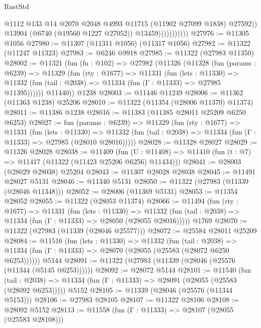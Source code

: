 \begin{lexlean}{RustStd}
\begin{coremodule}
                              @1112
                              @133
                              @14
                              @2070
                              @2048
                              @4993
                              @11715
                              (@11902 @27099 @1838)
                              @27592))
                          @13904
                          (@6740 (@19560 @1227 @27052))
                          @13459)))))))))))
@27976 := @11305 @1056
@27980 := @11307 (@11311 @1056) (@11317 @1056)
@27982 := @11322 (@11247 @11323)
@27983 := @6246 @9918
@27985 := @11322 (@27983 @11350)
@28002 := @11321
    (fun (fn : @102) =>
    @27982
      (@11326
        (@11328
          (fun (params : @6239) =>
          @11329
            (fun (rty : @1677) =>
            @11331
              (fun (lets : @11330) =>
              @11332 (fun (tail : @2038) => @11334 (fun (Γ : @11333) => @27985 @11395))))))
        @11440))
    @1238
@28003 := @11446 @11249
@28006 := @11362 (@11363 @1238) @25206
@28010 := @11322 (@11354 (@28006 @11370) @11374)
@28011 := @11386 @1238
@28016 := @11383 (@11385 @28011 @25209 @6250 @6253)
@28027 := fun (params : @6239) =>
  @11329
    (fun (rty : @1677) =>
    @11331
      (fun (lets : @11330) =>
      @11332 (fun (tail : @2038) => @11334 (fun (Γ : @11333) => @27985 (@28010 @28016)))))
@28028 := @11328 @28027
@28029 := @11326 @28028
@28038 := @11409
    (fun (U : @11408) => @11410 (fun (t : @7) => @11417 (@11322 (@11423 @25206 @6256) @11434)))
@28041 := @28003 (@28029 @28038) @25204
@28043 := @11307 @28028 @28038
@28045 := @11491 @28027 @5131
@28046 := @11340 @5131
@28050 := @11322 (@27983 (@11339 (@28046 @11348)))
@28052 := @28006 (@11369 @5131)
@28053 := @11354 @28052
@28055 := @11322 (@28053 @11374)
@28066 := @11494
    (fun (rty : @1677) =>
    @11331
      (fun (lets : @11330) =>
      @11332 (fun (tail : @2038) => @11334 (fun (Γ : @11333) => @28050 (@28055 @28016)))))
    @1769
@28070 := @11322 (@27983 (@11339 (@28046 @25577)))
@28072 := @25584 @28011 @25209
@28084 := @11516
    (fun (lets : @11330) =>
    @11332
      (fun (tail : @2038) =>
      @11334 (fun (Γ : @11333) => @28070 (@28055 (@25583 (@28072 @6250 @6253))))))
    @5144
@28091 := @11322 (@27983 (@11339 (@28046 (@25576 (@11344 (@5145 @6253))))))
@28092 := @28072 @5144
@28101 := @11540
    (fun (tail : @2038) => @11334 (fun (Γ : @11333) => @28091 (@28055 (@25583 (@28092 @6253)))))
    @5152
@28105 := @11339 (@28046 (@25576 (@11344 @5153)))
@28106 := @27983 @28105
@28107 := @11322 @28106
@28108 := @28092 @5152
@28113 := @11558 (fun (Γ : @11333) => @28107 (@28055 (@25583 @28108)))

\end{coremodule}
\end{lexlean}
